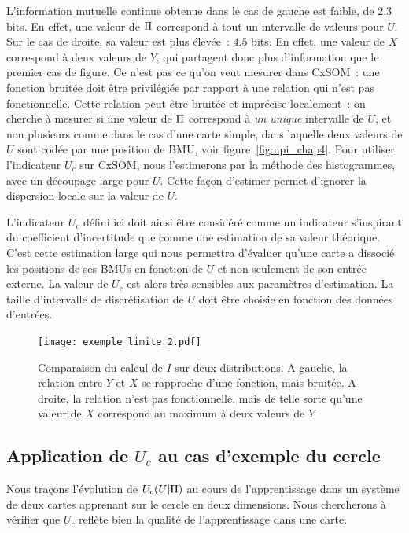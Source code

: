 \documentclass[../main]{subfiles}
\begin{document}
L'information mutuelle continue obtenue dans le cas de gauche est faible, de $2.3$ bits.
En effet, une valeur de $\Pi$ correspond à tout un intervalle de valeurs pour $U$. 
Sur le cas de droite, sa valeur est plus élevée~: $4.5$ bits. En effet, une valeur de $X$ correspond à deux valeurs de $Y$, qui partagent donc plus d'information que le premier cas de figure.
Ce n'est pas ce qu'on veut mesurer dans CxSOM~: une fonction bruitée doit être privilégiée par rapport à une relation qui n'est pas fonctionnelle.
Cette relation peut être bruitée et imprécise localement~: on cherche à mesurer si une valeur de $\Pi$ correspond à \emph{un unique} intervalle de $U$, et non plusieurs comme dans le cas d'une carte simple, dans laquelle deux valeurs de $U$ sont codée par une position de BMU, voir figure~\ref{fig:upi_chap4}.
Pour utiliser l'indicateur $U_c$ sur CxSOM, nous l'estimerons par la méthode des histogrammes, avec un découpage large pour $U$. 
Cette façon d'estimer permet d'ignorer la dispersion locale sur la valeur de $U$.

L'indicateur $U_c$ défini ici doit ainsi être considéré comme un indicateur s'inspirant du coefficient d'incertitude que comme une estimation de sa valeur théorique.
C'est cette estimation large qui nous permettra d'évaluer qu'une carte a dissocié les positions de ses BMUs en fonction de $U$ et non seulement de son entrée externe.
La valeur de $U_c$ est alors très sensibles aux paramètres d'estimation. La taille d'intervalle de discrétisation de $U$ doit être choisie en fonction des données d'entrées.

\begin{figure}
    \centering
    \texttt{[image: exemple\_limite\_2.pdf]}
    \caption{Comparaison du calcul de  $I$ sur deux distributions. A gauche, la relation entre $Y$ et $X$ se rapproche d'une fonction, mais bruitée. A droite, la relation n'est pas fonctionnelle, mais de telle sorte qu'une valeur de $X$ correspond au maximum à deux valeurs de $Y$}
    \label{fig:exemple-limite}
    \end{figure}

\subsection{Application de  $U_c$ au cas d'exemple du cercle}

Nous traçons l'évolution de $U_c(U|\Pi)$ au cours de l'apprentissage dans un système de deux cartes apprenant sur le cercle en deux dimensions.
Nous chercherons à vérifier que $U_c$ reflète bien la qualité de l'apprentissage dans une carte.
\end{document}
